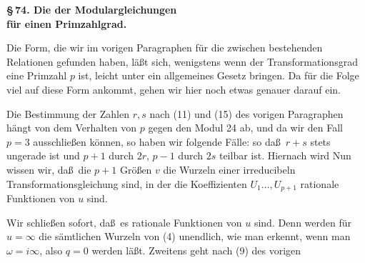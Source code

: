 
\begin{center}
\textbf{\S\,74. Die  der  Modulargleichungen}\\
\textbf{f\"ur einen Primzahlgrad.}
\end{center}

Die Form, die wir im vorigen Paragraphen f\"ur die zwischen
bestehenden Relationen gefunden haben, l\"a\ss t sich, wenigstens
wenn der Transformationsgrad eine Primzahl $p$ ist, leicht unter
ein allgemeines Gesetz bringen. Da f\"ur die Folge viel auf diese
Form ankommt, gehen wir hier noch etwas genauer darauf ein.

Die Bestimmung der Zahlen $r, s$ nach (11) und (15) des
vorigen Paragraphen h\"angt von dem Verhalten von $p$ gegen den
Modul 24 ab, und da wir den Fall $p=3$ ausschlie\ss en k\"onnen,
so haben wir folgende F\"alle:
so da\ss\ $r+s$ stets ungerade ist und $p+1$ durch $2r$, $p-1$
durch $2s$ teilbar ist. Hiernach wird
Nun wissen wir, da\ss\ die $p+1$ Gr\"o\ss en $v$ die Wurzeln einer
irreducibeln Transformationsgleichung
sind, in der die Koeffizienten $U_1\ldots, U_{p+1}$ rationale
Funktionen von $u$ sind.

Wir schlie\ss en sofort, da\ss\ es  rationale Funktionen
von $u$ sind. Denn  werden f\"ur $u=\infty$ die s\"amtlichen
Wurzeln von (4) unendlich, wie man erkennt, wenn man $\omega=i\infty$,
also $q=0$ werden l\"a\ss t. Zweitens geht nach (9) des vorigen
